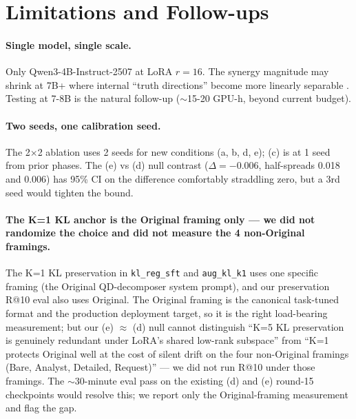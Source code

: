 \documentclass[11pt]{article}
\newcommand{\code}[1]{\texttt{\small #1}}
\begin{document}
\section{Limitations and Follow-ups}
\label{sec:limitations}

\paragraph{Single model, single scale.}
Only Qwen3-4B-Instruct-2507 at LoRA $r=16$. The synergy magnitude may
shrink at 7B+ where internal ``truth directions'' become more linearly
separable \citep{markstegmark2023geometry}. Testing at 7-8B is the natural
follow-up ($\sim$15-20 GPU-h, beyond current budget).

\paragraph{Two seeds, one calibration seed.}
The 2$\times$2 ablation uses 2 seeds for new conditions (a, b, d, e); (c)
is at 1 seed from prior phases. The (e) vs (d) null contrast
($\Delta = -0.006$, half-spreads 0.018 and 0.006) has 95\% CI on the
difference comfortably straddling zero, but a 3rd seed would tighten the
bound.

\paragraph{The K=1 KL anchor is the Original framing only --- we did not randomize the choice and did not measure the 4 non-Original framings.}
The K=1 KL preservation in \code{kl\_reg\_sft} and \code{aug\_kl\_k1}
uses one specific framing (the Original QD-decomposer system prompt),
and our preservation R@10 eval also uses Original. The Original framing
is the canonical task-tuned format and the production deployment target,
so it is the right load-bearing measurement; but our (e) $\approx$ (d)
null cannot distinguish ``K=5 KL preservation is genuinely redundant
under LoRA's shared low-rank subspace'' from ``K=1 protects Original
well at the cost of silent drift on the four non-Original framings
(Bare, Analyst, Detailed, Request)'' --- we did not run R@10 under
those framings. The $\sim$30-minute eval pass on the existing (d) and
(e) round-15 checkpoints would resolve this; we report only the
Original-framing measurement and flag the gap.
\end{document}

